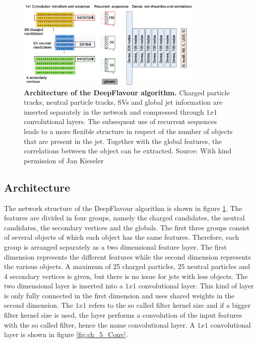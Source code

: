 \begin{figure}
\centering
\includegraphics[width=0.8\textwidth]{assets/DF.png}
\caption[Architecture of the DeepFlavour Algorithm]{\textbf{Architecture of the DeepFlavour algorithm.} Charged particle tracks, neutral particle tracks, SVs and global jet information are inserted separately in the network and compressed through $1x1$ convolutional layers. The subsequent use of recurrent sequences leads to a more flexible structure in respect of the number of objects that are present in the jet. Together with the global features, the correlations between the object can be extracted. Source: With kind permission of Jan Kieseler}
\label{fig:ch_5_DF}
\end{figure}

\subsection{Architecture}
The network structure of the DeepFlavour algorithm is shown in figure \ref{fig:ch_5_DF}. The features are divided in four groups, namely the charged candidates, the neutral candidates, the secondary vertices and the globals. The first three groups consist of several objects of which each object has the same features. Therefore, each group is arranged separately as a two dimensional feature layer. The first dimension represents the different features while the second dimension represents the various objects. A maximum of 25 charged particles, 25 neutral particles and 4 secondary vertices is given, but there is no issue for jets with less objects. The two dimensional layer is inserted into a $1x1$ convolutional layer. This kind of layer is only fully connected in the first dimension and uses shared weights in the second dimension. The $1x1$ refers to the so called filter kernel size and if a bigger filter kernel size is used, the layer performs a convolution of the input features with the so called filter, hence the name convolutional layer. A $1x1$ convolutional layer is shown in figure \ref{fig:ch_5_Conv}.\\

